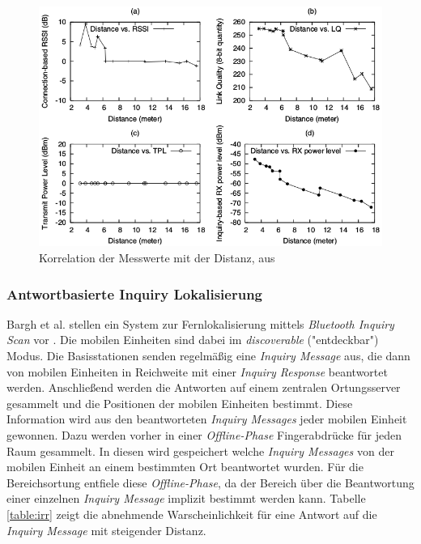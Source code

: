 \begin{figure}[h]
  \centering
	\includegraphics[width=\textwidth]{images/bluetoothmess.png}
  \caption{Korrelation der Messwerte mit der Distanz, aus \cite{hossain2007comprehensive}}
  \label{fig:bluetoothmess}
\end{figure}

\subsubsection{Antwortbasierte Inquiry Lokalisierung}
Bargh et al. stellen ein System zur Fernlokalisierung mittels \emph{Bluetooth Inquiry Scan} vor \cite{bargh2008indoor}.
Die mobilen Einheiten sind dabei im \emph{discoverable} ("{}entdeckbar"{}) Modus.
Die Basisstationen senden regelmäßig eine \emph{Inquiry Message} aus, die dann von mobilen Einheiten in Reichweite mit einer \emph{Inquiry Response} beantwortet werden. 
Anschließend werden die Antworten auf einem zentralen Ortungsserver gesammelt und die Positionen der mobilen Einheiten bestimmt.
Diese Information wird aus den beantworteten \emph{Inquiry Messages} jeder mobilen Einheit gewonnen.
Dazu werden vorher in einer \emph{Offline-Phase} Fingerabdrücke für jeden Raum gesammelt.
In diesen wird gespeichert welche \emph{Inquiry Messages} von der mobilen Einheit an einem bestimmten Ort beantwortet wurden.
Für die Bereichsortung entfiele diese \emph{Offline-Phase}, da der Bereich über die Beantwortung einer einzelnen \emph{Inquiry Message} implizit bestimmt werden kann.
Tabelle \ref{table:irr} zeigt die abnehmende Warscheinlichkeit für eine Antwort auf die \emph{Inquiry Message} mit steigender Distanz.

